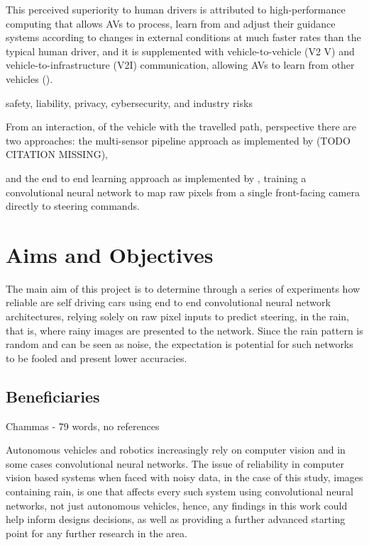 This perceived superiority to human drivers is attributed to high-performance computing that allows AVs to process, learn from and adjust their guidance systems according
to changes in external conditions at much faster rates than the typical human driver, and it
is supplemented with vehicle-to-vehicle (V2 V) and vehicle-to-infrastructure (V2I) communication, allowing AVs to learn from other vehicles (\cite{west2016moving}).

safety, liability, privacy, cybersecurity, and industry risks \cite{Taeihagh_2018}

From an interaction, of the vehicle with the travelled path, perspective there are two approaches: the multi-sensor pipeline approach as implemented by (TODO CITATION MISSING), 

and the end to end learning approach as implemented by \cite{bojarski2016end}, training a convolutional neural network to map raw pixels from a single front-facing camera directly to steering commands.




\section{Aims and Objectives}


The main aim of this project is to determine through a series of experiments how reliable are self driving cars using end to end convolutional neural network architectures, relying solely on raw pixel inputs to predict steering, in the rain, that is, where rainy images are presented to the network. Since the rain pattern is random and can be seen as noise, the expectation is potential for such networks to be fooled and present lower accuracies.

\subsection{Beneficiaries}

Chammas - 79 words, no references

Autonomous vehicles and robotics increasingly rely on computer vision and in some cases convolutional neural networks. The issue of reliability in computer vision based systems when faced with noisy data, in the case of this study, images containing rain, is one that affects every such system using convolutional neural networks, not just autonomous vehicles, hence, any findings in this work could help inform designs decisions, as well as providing a further advanced starting point for any further research in the area.

